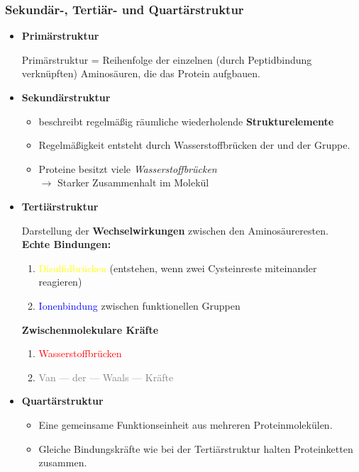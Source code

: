 \documentclass[a4paper, 12pt]{scrartcl}
\begin{document}
\subsubsection{Sekundär-, Tertiär- und Quartärstruktur}
\begin{itemize}
    \item \textbf{Primärstruktur}

        Primärstruktur = Reihenfolge der einzelnen (durch Peptidbindung
        verknüpften) Aminosäuren, die das Protein aufgbauen.

    \item \textbf{Sekundärstruktur}

        \begin{itemize}
            \item beschreibt regelmäßig räumliche wiederholende \textbf{Strukturelemente}
            \item Regelmäßigkeit entsteht durch Wasserstoffbrücken der 
                und der
                Gruppe.
            \item Proteine besitzt viele \textit{Wasserstoffbrücken}\\
                $ \rightarrow$ Starker Zusammenhalt im Molekül
        \end{itemize}

    \item \textbf{Tertiärstruktur}

        Darstellung der \textbf{Wechselwirkungen} zwischen den
        Aminosäureresten.\\
        \textbf{Echte Bindungen:}
        \begin{enumerate}
            \item \textcolor{yellow}{Disulfidbrücken} (entstehen, wenn zwei
                Cysteinreste miteinander reagieren)
            \item \textcolor{blue}{Ionenbindung} zwischen funktionellen Gruppen
        \end{enumerate}
        \textbf{Zwischenmolekulare Kräfte}
        \begin{enumerate}
            \item \textcolor{red}{Wasserstoffbrücken}
            \item \textcolor{gray}{Van --- der --- Waals --- Kräfte}
        \end{enumerate}

    \item \textbf{Quartärstruktur}

        \begin{itemize}
            \item Eine gemeinsame Funktionseinheit aus mehreren
                Proteinmolekülen.
            \item Gleiche Bindungskräfte wie bei der Tertiärstruktur halten
                Proteinketten zusammen.
        \end{itemize}
\end{itemize}
\end{document}

